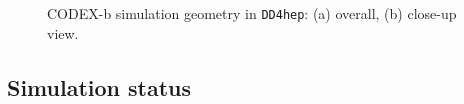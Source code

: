 
\begin{figure}
\centering
{}
\caption{\label{fig:geo_dd4hep}
    CODEX-b simulation geometry in {\tt DD4hep}: (a) overall, (b) close-up view. 
}
\end{figure}


\subsection{Simulation status}


